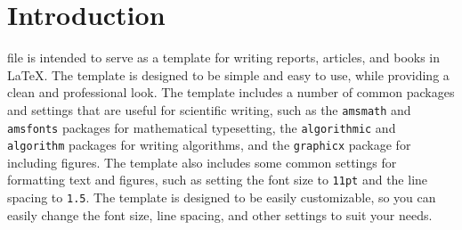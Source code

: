 
\section{Introduction}\label{sec:introduction}

 file is intended to serve as a template for writing reports, articles, and books in \LaTeX.
The template is designed to be simple and easy to use, while providing a clean and professional look.
The template includes a number of common packages and settings that are useful for scientific writing,
such as the \texttt{amsmath} and \texttt{amsfonts} packages for mathematical typesetting,
the \texttt{algorithmic} and \texttt{algorithm} packages for writing algorithms,
and the \texttt{graphicx} package for including figures.
The template also includes some common settings for formatting text and figures,
such as setting the font size to \texttt{11pt} and the line spacing to \texttt{1.5}.
The template is designed to be easily customizable, so you can easily change the font size, line spacing,
and other settings to suit your needs.